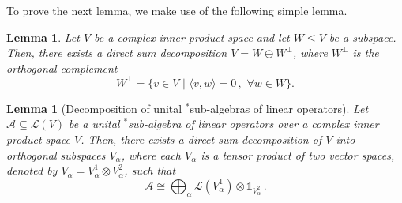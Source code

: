 \documentclass[12pt]{article}
\theoremstyle{plain}
\newtheorem{lemma}[theorem]{Lemma}
\begin{document}
To prove the next lemma, we make use of the following simple lemma.

\begin{lemma}\label{lem:direct-sum-orth}
Let $V$ be a complex inner product space and let $W \leq V$ be a subspace. Then, there exists a direct sum decomposition $V = W \oplus W^\perp$, where $W^\perp$ is the orthogonal complement
$$
W^\perp = \{ v \in V \,\, | \,\, \langle v,w\rangle = 0\,, \,\, \forall w \in W\}. 
$$
\end{lemma}


\begin{lemma}[Decomposition of unital $^*$sub-algebras of linear operators]
    Let $\mathcal{A} \subseteq \mathcal{L}(V)$ be a unital $^*$sub-algebra of linear operators over a complex inner product space $V$. Then, there exists a direct sum decomposition of $V$ into orthogonal subspaces $V_\alpha$, where each $V_\alpha$ is a tensor product of two vector spaces, denoted by $V_\alpha = V^1_\alpha \otimes V^2_\alpha$, such that
    \[ \mathcal{A} \cong \bigoplus_{\alpha} \mathcal{L}(V^1_\alpha) \otimes \mathbb{1}_{V^2_\alpha} \, . \]
\end{lemma}
\end{document}
